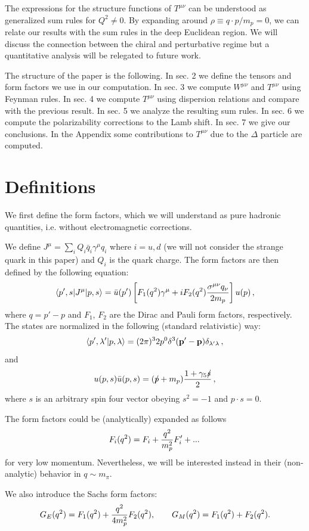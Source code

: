 \documentclass[a4paper,12pt]{article}
\newcommand{\be}{\begin{equation}}
\newcommand{\ee}{\end{equation}}
\begin{document}
The expressions for the structure functions of $T^{\mu\nu}$ can be understood as 
generalized sum rules for $Q^2 \not= 0$. By expanding around $\rho \equiv q\cdot p/m_p=0$, 
we can relate our results with the sum rules in the deep Euclidean region. We will  
discuss the connection between the chiral and perturbative regime but a 
quantitative analysis will be relegated to future work.

The structure of the paper is the following. In sec. 2 we define the tensors and 
form factors we use in our computation. In sec. 3 we compute $W^{\mu\nu}$ and 
$T^{\mu\nu}$ using Feynman rules. In sec. 4 we compute $T^{\mu\nu}$ 
using dispersion relations and compare with the previous result. 
In sec. 5 we analyze the resulting sum rules. In sec. 6 we compute the 
polarizability corrections to the Lamb shift. 
In sec. 7 we give our conclusions. In the Appendix some contributions 
to $T^{\mu\nu}$ due to the $\Delta$ particle are computed. 

\section{Definitions}

We first define the form factors, which we will understand 
as pure hadronic quantities, i.e. without electromagnetic 
corrections. 

We define $J^\mu=\sum_i Q_i{\bar q}_i\gamma^\mu q_i$ where $i=u,d$ (we will 
not consider the strange quark in this paper)
and $Q_i$ is the quark charge. The 
form factors are then defined by the following equation:   
\be
\langle {p^\prime,s}|J^\mu|{p,s}\rangle
=
\bar u(p^\prime) \left[ F_1(q^2) \gamma^\mu +
i F_2(q^2){\sigma^{\mu \nu} q_\nu\over 2 m_p} \right]u(p)
\label{current}
\,,
\ee
where $q=p'-p$  and $F_1$, $F_2$ are the Dirac and Pauli form factors,
respectively. The states
are normalized in the following (standard relativistic) way:
\be
\langle p',\lambda'|p,\lambda \rangle
=
(2\pi)^3 2p^0\delta^3({\bf p}'-{\bf p})
\delta_{\lambda' \lambda}\,,
\ee
and 
\be
u(p,s){\bar u}(p,s)=({\rlap/p+m_p }){1+\gamma_5{\rlap/s} \over 2}
\,,
\ee
where $s$ is an arbitrary spin four vector obeying $s^2=-1$ and
$p\cdot s=0$.
 
The form factors could be (analytically) expanded as follows 
\be
F_i(q^2)=F_i+{q^2 \over m_p^2}F_i^{\prime}+...\,
\ee 
for very low momentum. Nevertheless, we will be interested instead in their 
(non-analytic) behavior in $q \sim m_{\pi}$. 

We also introduce the Sachs form factors:
\be
G_E(q^2)=F_1(q^2)+{q^2 \over 4m_p^2}F_2(q^2), \qquad G_M(q^2)=F_1(q^2)+F_2(q^2). 
\ee
\end{document}
